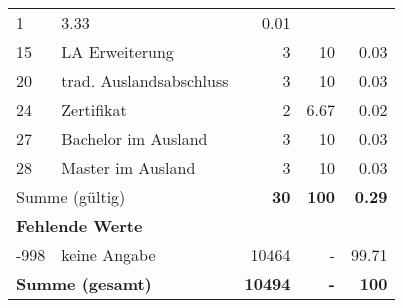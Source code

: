 \begin{longtable}{lXrrr}
       \num{1} &
       \num[round-mode=places,round-precision=2]{3.33} &
         \num[round-mode=places,round-precision=2]{0.01} \\

     15 &
     \multicolumn{1}{X}{ LA Erweiterung   } &


       \num{3} &
       \num[round-mode=places,round-precision=2]{10} &
         \num[round-mode=places,round-precision=2]{0.03} \\

     20 &
     \multicolumn{1}{X}{ trad. Auslandsabschluss   } &


       \num{3} &
       \num[round-mode=places,round-precision=2]{10} &
         \num[round-mode=places,round-precision=2]{0.03} \\

     24 &
     \multicolumn{1}{X}{ Zertifikat   } &


       \num{2} &
       \num[round-mode=places,round-precision=2]{6.67} &
         \num[round-mode=places,round-precision=2]{0.02} \\

     27 &
     \multicolumn{1}{X}{ Bachelor im Ausland   } &


       \num{3} &
       \num[round-mode=places,round-precision=2]{10} &
         \num[round-mode=places,round-precision=2]{0.03} \\

     28 &
     \multicolumn{1}{X}{ Master im Ausland   } &


       \num{3} &
       \num[round-mode=places,round-precision=2]{10} &
         \num[round-mode=places,round-precision=2]{0.03} \\
     \midrule
     \multicolumn{2}{l}{Summe (gültig)} &
       \textbf{\num{30}} &
     \textbf{\num{100}} &
       \textbf{\num[round-mode=places,round-precision=2]{0.29}} \\
     \multicolumn{5}{l}{\textbf{Fehlende Werte}}\\
       -998 &
       keine Angabe &
         \num{10464} &
        - &
         \num[round-mode=places,round-precision=2]{99.71} \\
     \midrule
     \multicolumn{2}{l}{\textbf{Summe (gesamt)}} &
          \textbf{\num{10494}} &
        \textbf{-} &
        \textbf{\num{100}} \\
     \bottomrule
     \end{longtable}
     
